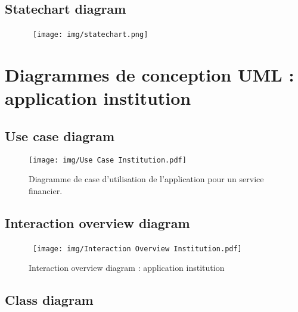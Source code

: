 \documentclass[]{report}
\begin{document}


\newpage

\subsection{Statechart diagram}

\begin{figure}[h!]
\hspace{2.25cm}
\hbox{
	\centering\texttt{[image: img/statechart.png]}
}
\end{figure}



\newpage



\section{Diagrammes de conception UML : application institution}



\subsection{Use case diagram}



\begin{figure}[h]
	\centering\texttt{[image: img/Use Case Institution.pdf]}
	\caption{Diagramme de case d'utilisation de l'application pour un service financier.}
\end{figure}

\newpage

\subsection{Interaction overview diagram}



\vspace{2.5cm}
\begin{figure}[h!]
\hbox{
	\centering\texttt{[image: img/Interaction Overview Institution.pdf]}
}
\caption{Interaction overview diagram : application institution}
\end{figure}

\newpage

\subsection{Class diagram}
\end{document}

